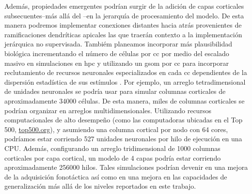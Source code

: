 Además, propiedades emergentes podrían surgir de la adición de capas corticales subsecuentes--más allá del --en la jerarquía de procesamiento del modelo. De esta manera podremos implementar conexiones distantes hacia atrás provenientes de ramificaciones dendríticas apicales las que traerán contexto a la implementación jerárquica no supervisada. Tambiém planeamos incorporar más plausibilidad biológica incrementando el número de células por \gls{cc} por medio del escalado masivo en simulaciones en \gls{hpc} y utilizando un \gls{gsom} por \gls{cc} para incorporar reclutamiento de recursos neuronales especializados en cada \gls{cc} dependientes de la dispersión estadística de sus estímulos \cite{Meyer19113}. Por ejemplo, un arreglo tetradimensional de unidades neuronales se podría usar para simular columnas corticales de aproximadamente 34000 células. De esta manera, miles de columnas corticales se podrían organizar en arreglos multidimensionales. Utilizando recursos computacionales de alto desempeño (como las computadoras ubicadas en el Top 500, \url{top500.org}), y asumiendo una columna cortical por nodo con 64 cores, podríamos estar corriendo 527 unidades neuronales por hilo de ejecución en una CPU. Además, configurando un arreglo tridimensional de 1000 columnas corticales por capa cortical, un modelo de 4 capas podría estar corriendo aproximadamente 256000 hilos. Tales simulaciones podrían devenir en una mejora de la adquisición fonotáctica así como en una mejora en las capacidades de generalización más allá de los niveles reportados en este trabajo.



